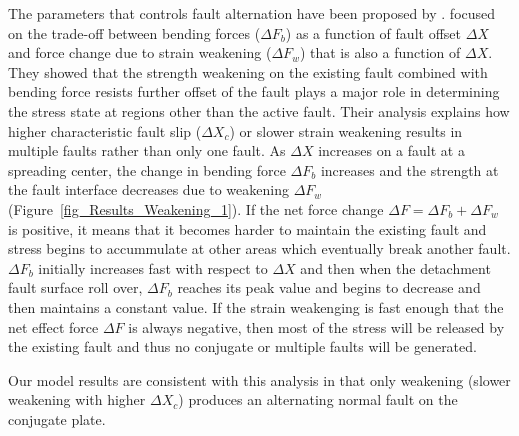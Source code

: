 \documentclass[draft,gc]{agutex}
\begin{document}
\begin{article}
The parameters that controls fault alternation have been proposed by \citet{Lavier2000}. \citet{Lavier2000} focused on the trade-off between bending forces ($\Delta F_{b}$) as a function of fault offset $\Delta X$ and force change due to strain weakening ($\Delta F_{w}$) that is also a function of  $\Delta X$. They showed that the strength weakening on the existing fault combined with bending force resists further offset of the fault plays a major role in determining the stress state at regions other than the active fault. Their analysis explains how higher characteristic fault slip ($\Delta X_{c}$) or slower strain weakening results in multiple faults rather than only one fault. As $\Delta X$ increases on a fault at a spreading center, the change in bending force $\Delta F_{b}$ increases and the strength at the fault interface decreases due to weakening $\Delta F_{w}$ (Figure~\ref{fig_Results_Weakening_1}). If the net force change $\Delta F = \Delta F_{b}+ \Delta F_{w}$ is positive, it means that it becomes harder to maintain the existing fault and stress begins to accummulate at other areas which eventually break another fault. $\Delta F_{b}$ initially increases fast with respect to $\Delta X$ and then when the detachment fault surface roll over, $\Delta F_{b}$ reaches its peak value and begins to decrease and then maintains a constant value. If the strain weakenging is fast enough that the net effect force $\Delta F$ is always negative, then most of the stress will be released by the existing fault and thus no conjugate or multiple faults will be generated.

Our model results are consistent with this analysis in that only weakening (slower weakening with higher $\Delta X_{c}$) produces an alternating normal fault on the conjugate plate.


\end{article}
\end{document}
